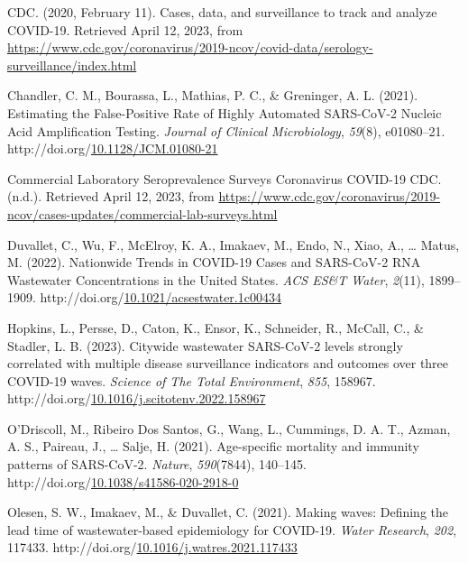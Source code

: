 \documentclass[12pt,twoside]{smiththesis}
\newlength{\cslhangindent}
\newenvironment{CSLReferences}[2] %
 {%
\setlength{\parindent}{0pt}
\ifodd #1 \everypar{\setlength{\hangindent}{\cslhangindent}}\ignorespaces\fi
\ifnum #2 > 0
\setlength{\parskip}{#2\baselineskip}
  \fi
}%
{}
\begin{document}
\hypertarget{refs}{}
\begin{CSLReferences}{1}{0}
\leavevmode{}%
CDC. (2020, February 11). Cases, data, and surveillance to track and analyze {COVID-19}. Retrieved April 12, 2023, from \url{https://www.cdc.gov/coronavirus/2019-ncov/covid-data/serology-surveillance/index.html}

\leavevmode{}%
Chandler, C. M., Bourassa, L., Mathias, P. C., \& Greninger, A. L. (2021). Estimating the {False-Positive Rate} of {Highly Automated SARS-CoV-2 Nucleic Acid Amplification Testing}. \emph{Journal of Clinical Microbiology}, \emph{59}(8), e01080--21. http://doi.org/\href{https://doi.org/10.1128/JCM.01080-21}{10.1128/JCM.01080-21}

\leavevmode{}%
Commercial {Laboratory Seroprevalence Surveys} \textbar{} {Coronavirus} \textbar{} {COVID-19} \textbar{} {CDC}. (n.d.). Retrieved April 12, 2023, from \url{https://www.cdc.gov/coronavirus/2019-ncov/cases-updates/commercial-lab-surveys.html}

\leavevmode{}%
Duvallet, C., Wu, F., McElroy, K. A., Imakaev, M., Endo, N., Xiao, A., \ldots{} Matus, M. (2022). Nationwide {Trends} in {COVID-19 Cases} and {SARS-CoV-2 RNA Wastewater Concentrations} in the {United States}. \emph{ACS ES\&T Water}, \emph{2}(11), 1899--1909. http://doi.org/\href{https://doi.org/10.1021/acsestwater.1c00434}{10.1021/acsestwater.1c00434}

\leavevmode{}%
Hopkins, L., Persse, D., Caton, K., Ensor, K., Schneider, R., McCall, C., \& Stadler, L. B. (2023). Citywide wastewater {SARS-CoV-2} levels strongly correlated with multiple disease surveillance indicators and outcomes over three {COVID-19} waves. \emph{Science of The Total Environment}, \emph{855}, 158967. http://doi.org/\href{https://doi.org/10.1016/j.scitotenv.2022.158967}{10.1016/j.scitotenv.2022.158967}

\leavevmode{}%
O'Driscoll, M., Ribeiro Dos Santos, G., Wang, L., Cummings, D. A. T., Azman, A. S., Paireau, J., \ldots{} Salje, H. (2021). Age-specific mortality and immunity patterns of {SARS-CoV-2}. \emph{Nature}, \emph{590}(7844), 140--145. http://doi.org/\href{https://doi.org/10.1038/s41586-020-2918-0}{10.1038/s41586-020-2918-0}

\leavevmode{}%
Olesen, S. W., Imakaev, M., \& Duvallet, C. (2021). Making waves: {Defining} the lead time of wastewater-based epidemiology for {COVID-19}. \emph{Water Research}, \emph{202}, 117433. http://doi.org/\href{https://doi.org/10.1016/j.watres.2021.117433}{10.1016/j.watres.2021.117433}


\end{CSLReferences}
\end{document}
